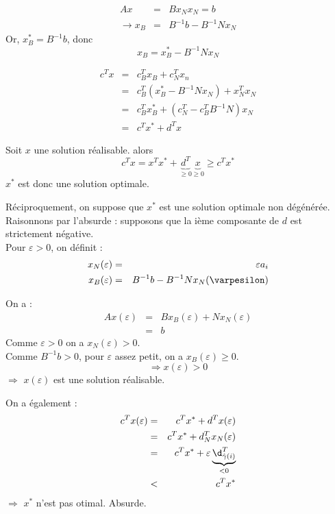 \begin{dem}
\begin{eqnarray*}
	Ax&=&Bx_Nx_N=b\\
\rightarrow x_B&=&B^{-1}b-B^{-1}Nx_N
\end{eqnarray*}
Or, $x^*_B=B^{-1}b$, donc \[x_B=x^*_B-B^{-1}Nx_N\]

\begin{eqnarray*}
	c^Tx&=&c_B^Tx_B+c^T_Nx_n\\
	&=&c^T_B(x^*_B-B^{-1}Nx_N)+x^T_N x_N\\
	&=&c^T_Bx_B^*+(c^T_N-c^T_BB^{-1}N)x_N\\
	&=&c^Tx^*+d^Tx
\end{eqnarray*}
\end{dem}



\begin{dem}
Soit $x$ une solution réalisable. alors 
\[c^Tx=x^Tx^*+\underbrace{d^T}_{\geq 0}\underbrace{x}_{\geq 0}\geq c^Tx^*\]
$x^*$ est donc une solution optimale.

\bigskip
Réciproquement, on suppose que $x^*$ est une solution optimale non dégénérée.\\
Raisonnons par l'absurde : supposons que la ième composante de $d$ est strictement négative.\\
Pour $\varepsilon>0$, on définit :
\begin{eqnarray*}
	x_N(\varepsilon)&=&\varepsilon a_i\\
	x_B(\varepsilon)&=&B^{-1}b-B^{-1}Nx_N(\varpesilon)
\end{eqnarray*}

On a :
\begin{eqnarray*}
	Ax(\varepsilon)&=&Bx_B(\varepsilon)+Nx_N(\varepsilon)\\
			&=&b
\end{eqnarray*}
Comme $\varepsilon>0$ on a $x_N(\varepsilon)>0$.\\
Comme $B^{-1}b>0$, pour $\varepsilon$ assez petit, on a $x_B(\varepsilon)\geq 0$.\\
\[\Rightarrow x(\varepsilon)>0\]
$\Rightarrow$ $x(\varepsilon)$ est une solution réalisable.

\bigskip
On a également :
\begin{eqnarray*}
	c^Tx(\varepsilon)&=&c^Tx^*+d^Tx(\varepsilon)\\
		&=&c^Tx^*+d^T_Nx_N(\varepsilon)\\
		&=&c^Tx^*+\varepsilon \underbrace{\d^T_{\hat{\gamma}(i)}}_{<0}\\
		&<&c^Tx^*
\end{eqnarray*}
$\Rightarrow$ $x^*$ n'est pas otimal. Absurde.
\end{dem}

